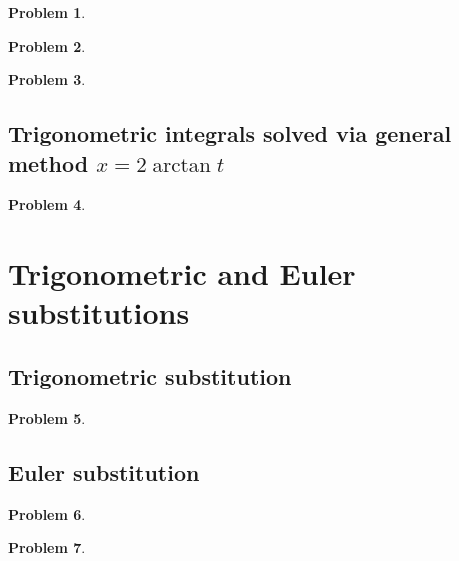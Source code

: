 \documentclass{article}
\newtheorem{problem}{Problem}
\begin{document}
\begin{problem}

\end{problem}

\begin{problem}

\end{problem}

\begin{problem}

\end{problem}
\subsection{Trigonometric integrals solved via general method $x=2\arctan t$}
\begin{problem}

\end{problem}


\section{Trigonometric and Euler substitutions}
\subsection{Trigonometric substitution}
\begin{problem}

\end{problem}


\subsection{Euler substitution}
\begin{problem}

\end{problem}


\begin{problem}

\end{problem}

\end{document}
